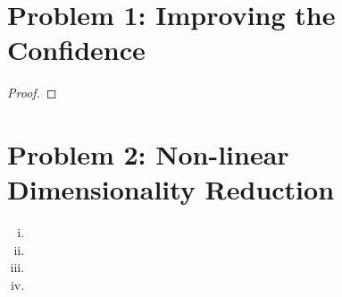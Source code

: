 \documentclass[twoside,11pt]{homework}
\date{\today} %
\DeclarePairedDelimiter{\2norm}{\lVert}{\rVert^2_2}
\newcommand{\1}[1]{\mathds{1}\left[#1\right]}
\begin{document}
\maketitle

\section*{Problem 1: Improving the Confidence}

\begin{proof}



\end{proof}


\section*{Problem 2: Non-linear Dimensionality Reduction}

\begin{enumerate}[(i)]

\item


\item 


\item 


\item


\end{enumerate}
\end{document}
